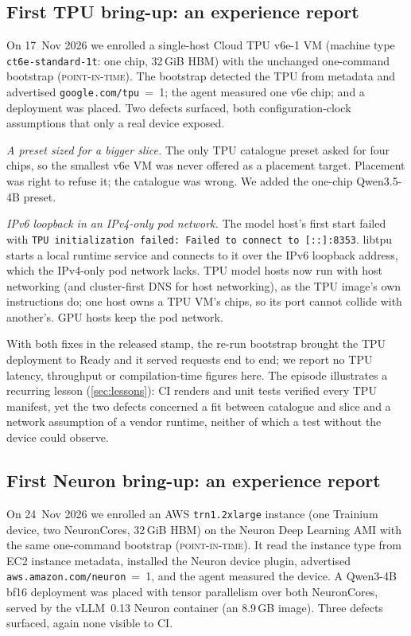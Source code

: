 \documentclass[conference,letterpaper]{IEEEtran}
\newcommand{\code}[1]{\texttt{\small #1}}
\newcommand{\ev}[1]{{\normalfont\textsc{#1}}}
\newcommand{\PointInTime}{\ev{point-in-time}}
\begin{document}
\subsection{First TPU bring-up: an experience report}
\label{sec:tpu-bringup}
On 17~Nov 2026 we enrolled a single-host Cloud TPU v6e-1 VM (machine type
\code{ct6e-standard-1t}: one chip, 32\,GiB HBM) with the unchanged one-command bootstrap
(\PointInTime{}). The bootstrap detected the TPU from metadata and advertised
\code{google.com/tpu}~=~1; the agent measured one v6e chip; and a deployment was placed. Two
defects surfaced, both configuration-clock assumptions that only a real device exposed.

\emph{A preset sized for a bigger slice.} The only TPU catalogue preset asked for four chips,
so the smallest v6e VM was never offered as a placement target. Placement was right to refuse
it; the catalogue was wrong. We added the one-chip Qwen3.5-4B preset.

\emph{IPv6 loopback in an IPv4-only pod network.} The model host's first start failed with
\code{TPU initialization failed: Failed to connect to [::]:8353}. libtpu starts a local
runtime service and connects to it over the IPv6 loopback address, which the IPv4-only pod
network lacks. TPU model hosts now run with host networking (and cluster-first DNS for host
networking), as the TPU image's own instructions do; one host owns a TPU VM's chips, so its
port cannot collide with another's. GPU hosts keep the pod network.

With both fixes in the released stamp, the re-run bootstrap brought the TPU deployment to Ready
and it served requests end to end; we report no TPU latency, throughput or compilation-time
figures here. The episode
illustrates a recurring lesson (\cref{sec:lessons}): CI renders and unit tests verified every
TPU manifest, yet the two defects concerned a fit between catalogue and slice and a network
assumption of a vendor runtime, neither of which a test without the device could observe.

\subsection{First Neuron bring-up: an experience report}
\label{sec:neuron-bringup}
On 24~Nov 2026 we enrolled an AWS \code{trn1.2xlarge} instance (one Trainium device, two
NeuronCores, 32\,GiB HBM) on the Neuron Deep Learning AMI with the same one-command bootstrap
(\PointInTime{}). It read the instance type from EC2 instance metadata, installed the Neuron
device plugin, advertised \code{aws.amazon.com/neuron}~=~1, and the agent measured the device. A
Qwen3-4B bf16 deployment was placed with tensor parallelism over both NeuronCores, served by the
vLLM~0.13 Neuron container (an 8.9\,GB image). Three defects surfaced, again none visible to CI.
\end{document}
